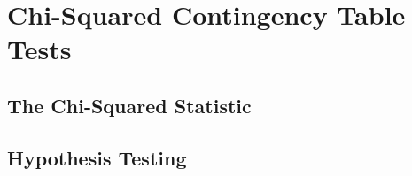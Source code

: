 \documentclass[../alevelmaths.tex]{subfiles}
\begin{document}
\chapter{Chi-Squared Contingency Table Tests}
\section{The Chi-Squared Statistic}
\section{Hypothesis Testing}
\end{document}
